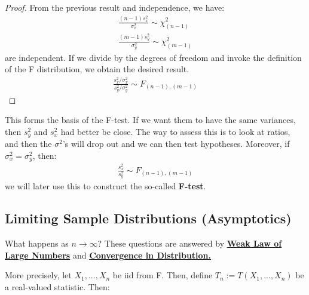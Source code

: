 \documentclass[11pt]{scrartcl}
\theoremstyle{definition}
\theoremstyle{remark}
\newcommand{\dfn}[1]{\textbf{\underline{#1}}}
\newcommand{\stat}[0]{T(X_1, ..., X_n )}
\begin{document}
{\begin{proof}
	From the previous result and independence, we have: 
	\begin{align*} 
		\frac{(n-1)s_x^2}{\sigma_x^2} \sim \chi_{(n-1)}^2  \\
		\frac{(m-1)s_y^2}{\sigma_y^2} \sim \chi_{(m-1)}^2
	\end{align*} 
	are independent. If we divide by the degrees of freedom and invoke the definition of the F distribution, we obtain the desired result. 
	\begin{align}
		\frac{s_x^2 / \sigma_x^2}{s_y^2 / \sigma_y^2} \sim F_{(n-1), (m-1)} 
	\end{align}
\end{proof}
	This forms the basis of the F-test. If we want them to have the same variances, then $s_y^2$ and $s_x^2$ had better be close. The way to assess this is to look at ratios, and then the $\sigma^2$'s will drop out and we can then test hypotheses. Moreover, if $\sigma_x^2 = \sigma_y^2$, then: 
	\begin{align*}
		\frac{s_x^2}{s_y^2} \sim F_{(n-1), (m-1)} 
	\end{align*}
	we will later use this to construct the so-called \textbf{F-test}. 
	
	\subsection{Limiting Sample Distributions (Asymptotics)}
	
\begin{center}
	What happens as $n \rightarrow \infty$? These questions are answered by \dfn{Weak Law of Large Numbers} and \dfn{Convergence in Distribution.} 
\end{center}

More precisely, let $X_1, ..., X_n$ be iid from F. Then, define $T_n := \stat$ be a real-valued statistic. Then: 

}
\end{document}
